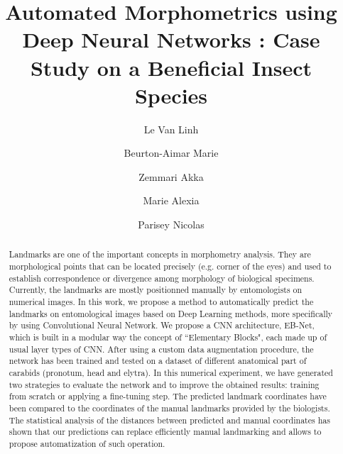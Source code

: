 \documentclass[review]{elsarticle}
\begin{document}
\begin{frontmatter}

  \title{Automated Morphometrics using Deep Neural Networks : Case Study on a Beneficial Insect Species}




\author[labri,inria]{Le Van Linh}
\author[labri]{Beurton-Aimar Marie}
\author[labri]{Zemmari Akka}
\author[igepp]{Marie Alexia}
\author[igepp]{Parisey Nicolas}


\address[labri]{LaBRI - University of Bordeaux, UMR 5800, 351, cours de la Liberation, 33405 Talence, France}
\address[igepp]{UMR 1349 IGEPP, BP 35327, 35653 Le Rheu, France}
\address[inria]{INRIA Bordeaux Sud-Ouest, 200, avenue de la Vieille Tour, 33405 Talence, France}


\begin{abstract}
Landmarks are one of the important concepts in morphometry
analysis. They are morphological points that can be located precisely
(e.g. corner of the eyes) and used to establish correspondence or
divergence among morphology of biological specimens. Currently, the
landmarks are mostly positionned manually by entomologists on
numerical images. In this work, we propose a method to automatically predict the
landmarks on entomological images based on Deep Learning methods, more specifically
by using Convolutional Neural Network. We propose a CNN architecture,
EB-Net, which is built in a modular way the concept of  ``Elementary Blocks", each made
up of usual layer types of CNN. After using a custom data
augmentation procedure,  the network has been trained and tested on a dataset of different
anatomical part of carabids (pronotum, head and elytra). In this
numerical experiment, we have generated two strategies to evaluate the
network and to improve the obtained results: training from scratch or
applying a fine-tuning step. The predicted landmark coordinates have
been compared to the coordinates of the manual landmarks provided by the
biologists. The statistical analysis of the distances between predicted
and manual coordinates has shown that our predictions can replace
efficiently manual landmarking and allows to propose automatization of
such operation.
\end{abstract}


\end{frontmatter}
\end{document}
